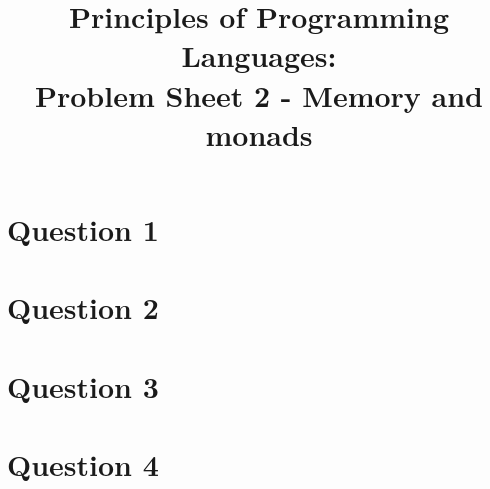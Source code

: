 \documentclass[11pt]{article} %
\title{Principles of Programming Languages: \\Problem Sheet 2 - Memory and monads}
\author{}
\date{}
\begin{document}
%
\maketitle




\section*{Question 1}



\section*{Question 2}



\clearpage
\section*{Question 3}


\section*{Question 4}

\end{document}
